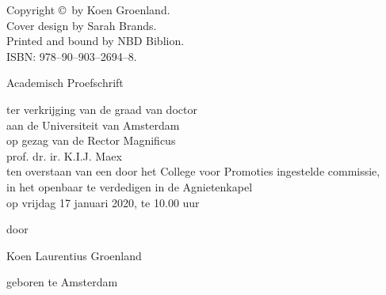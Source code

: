 \vspace{1cm}
\noindent
Copyright \copyright\  by Koen Groenland. \\[2ex] 
Cover design by Sarah Brands.\\                      
Printed and bound by NBD Biblion.\\[2ex]          
ISBN: 978--90--903--2694--8.

                     


\clearpage
\thispagestyle{empty}

\begin{center}
\vspace*{4cm}
{ \thetitle }%
\par\vspace {6cm}
{ \sc Academisch Proefschrift }
\par\vspace {.4cm} 
ter verkrijging van de graad van doctor\\
aan de Universiteit van Amsterdam\\
op gezag van de Rector Magnificus\\
prof. dr. ir. K.I.J. Maex\\             
ten overstaan van een door het College voor Promoties ingestelde commissie,  \\
in het openbaar te verdedigen in de Agnietenkapel \\       
op vrijdag 17 januari 2020, te 10.00 uur \\        
\par\vspace {.6cm} {door}
\par \vspace {.6cm} 
{\large Koen Laurentius Groenland}                        
\par\vspace {.6cm} 
{geboren te Amsterdam} 
\end{center}





\clearpage
